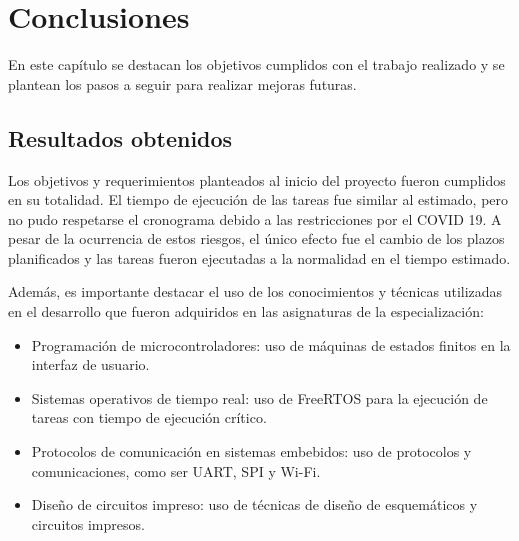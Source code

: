 
\chapter{Conclusiones} %

\label{Chapter5} %



En este capítulo se destacan los objetivos cumplidos con el trabajo realizado y se plantean los pasos a seguir para realizar mejoras futuras.


\section{Resultados obtenidos }

Los objetivos y requerimientos planteados al inicio del proyecto fueron cumplidos en su totalidad. El tiempo de ejecución de las tareas fue similar al estimado, pero no pudo respetarse el cronograma debido a las restricciones por el COVID 19. A pesar de la ocurrencia de estos riesgos, el único efecto fue el cambio de los plazos planificados y las tareas fueron ejecutadas a la normalidad en el tiempo estimado.

Además, es importante destacar el uso de los conocimientos y técnicas utilizadas en el desarrollo que fueron adquiridos en las asignaturas de la especialización:
\begin{itemize}
 \item Programación de microcontroladores: uso de máquinas de estados finitos en la interfaz de usuario.
 \item Sistemas operativos de tiempo real: uso de FreeRTOS para la ejecución de tareas con tiempo de ejecución crítico.
 \item Protocolos de comunicación en sistemas embebidos: uso de protocolos y comunicaciones, como ser UART, SPI y Wi-Fi.
 \item Diseño de circuitos impreso: uso de técnicas de diseño de esquemáticos y circuitos impresos.
\end{itemize}

